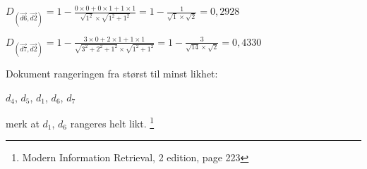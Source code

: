 \documentclass[]{article}
\begin{document}
$D_{(\overrightarrow{d6},\overrightarrow{d2})} = 1 - \frac{0\times0+0\times1+1\times1}{\sqrt{1^2}\times\sqrt{1^2 + 1^2}} = 1 - \frac{1}{\sqrt{1}\times\sqrt{2}} = 0,2928$
\vspace{2 mm}

$D_{(\overrightarrow{d7},\overrightarrow{d2})} = 1 - \frac{3\times0+2\times1+1\times1}{\sqrt{3^2+2^2+1^2}\times\sqrt{1^2+1^2}} = 1 - \frac{3}{\sqrt{14}\times\sqrt{2}} = 0,4330$
\vspace{10 mm}

Dokument rangeringen fra størst til minst likhet:
\vspace{2 mm}

\indent\indent$d_4$, $d_5$, $d_1$, $d_6$, $d_7$
\vspace{1 mm}

\indent\indent merk at $d_1$, $d_6$ rangeres helt likt.
\vspace{20 mm}
\let\thefootnote\relax\footnote{Modern Information Retrieval, 2 edition, page 223}
\end{document}
